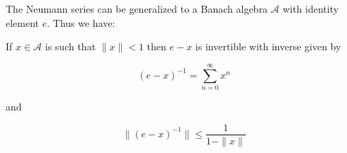\documentclass[12pt]{article}
\begin{document}
The Neumann series can be generalized to a Banach algebra $\mathcal{A}$ with identity element $e$.
 Thus we have:

If $x \in \mathcal{A}$ is such that $\|x\|<1$ then $e-x$ is invertible with inverse given by

\begin{displaymath}
(e-x)^{-1} = \sum_{n=0}^{\infty} x^n
\end{displaymath}

and

\begin{displaymath}
\|(e-x)^{-1}\| \le \frac{1}{1-\|x\|}
\end{displaymath}

\end{document}
